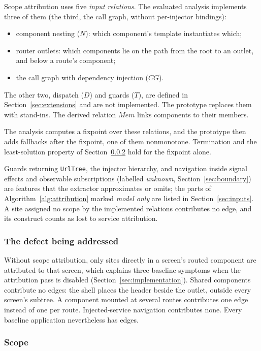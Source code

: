 Scope attribution uses five \emph{input relations}. The evaluated analysis implements three
of them (the third, the call graph, without per-injector bindings):
\begin{itemize}
\item component nesting ($N$): which component's template instantiates which;
\item router outlets: which components lie on the path from the root to an outlet, and below a
route's component;
\item the call graph with dependency injection ($\mathit{CG}$).
\end{itemize}
The other two, dispatch ($D$) and guards ($T$), are defined in Section~\ref{sec:extensions}
and are not implemented. The prototype replaces them with stand-ins. The derived relation
$\mathit{Mem}$ links components to their members.

The analysis computes a fixpoint over these relations, and the prototype then adds fallbacks
after the fixpoint, one of them nonmonotone. Termination and the least-solution property of
Section~\ref{sec:scope} hold for the fixpoint alone.

Guards returning \texttt{UrlTree}, the injector hierarchy, and navigation inside signal effects
and observable subscriptions (labelled \emph{unknown}, Section~\ref{sec:boundary}) are features
that the extractor approximates or omits; the parts of Algorithm~\ref{alg:attribution} marked
\emph{model only} are listed in Section~\ref{sec:inputs}. A site assigned no scope by the implemented relations contributes
no edge, and its construct counts as lost to service attribution.

\subsubsection{The defect being addressed}

Without scope attribution, only sites directly in a screen's routed component are attributed
to that screen, which explains three baseline symptoms when the attribution pass is disabled
(Section~\ref{sec:implementation}). Shared components contribute no edges: the shell places
the header beside the outlet, outside every screen's subtree. A component mounted at several
routes contributes one edge instead of one per route. Injected-service navigation contributes
none. Every baseline application nevertheless has edges.

\subsubsection{Scope}
\label{sec:scope}

